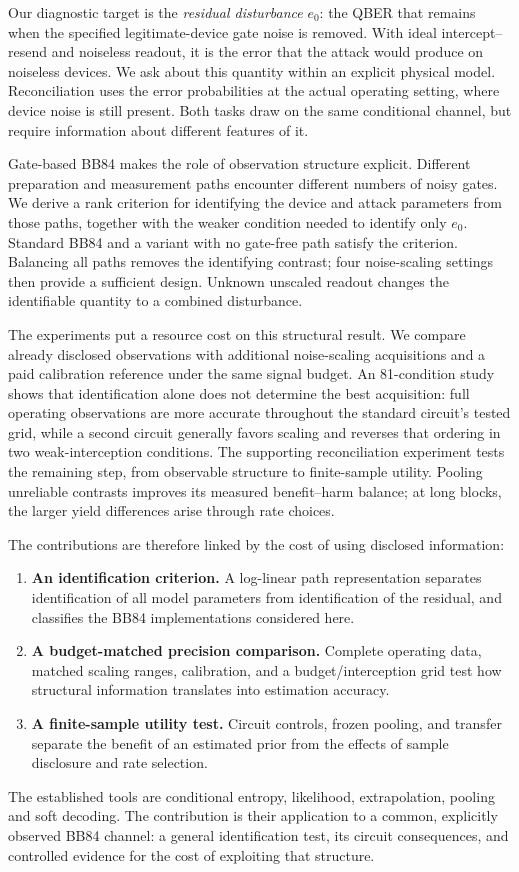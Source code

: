 \documentclass[manuscript,screen,review,anonymous]{acmart}
\begin{document}
Our diagnostic target is the \emph{residual disturbance} $e_0$: the QBER that
remains when the specified legitimate-device gate noise is removed. With ideal
intercept--resend and noiseless readout, it is the error that the attack would
produce on noiseless devices. We ask about this quantity within an explicit
physical model. Reconciliation uses the error probabilities at the actual
operating setting, where device noise is still present. Both tasks draw on the
same conditional channel, but require information about different features of it.

Gate-based BB84 makes the role of observation structure explicit. Different
preparation and measurement paths encounter different numbers of noisy gates.
We derive a rank criterion for identifying the device and attack parameters
from those paths, together with the weaker condition needed to identify only
$e_0$. Standard BB84 and a variant with no gate-free path satisfy the criterion.
Balancing all paths removes the identifying contrast; four noise-scaling settings
then provide a sufficient design. Unknown unscaled readout changes the
identifiable quantity to a combined disturbance.

The experiments put a resource cost on this structural result. We compare
already disclosed observations with additional noise-scaling acquisitions and
a paid calibration reference under the same signal budget. An 81-condition
study shows that identification alone does not determine the best acquisition:
full operating observations are more accurate throughout the standard circuit's
tested grid, while a second circuit generally favors scaling and reverses that
ordering in two weak-interception conditions. The supporting reconciliation
experiment tests the remaining step, from observable structure to finite-sample
utility. Pooling unreliable contrasts improves its measured benefit--harm
balance; at long blocks, the larger yield differences arise through rate choices.

The contributions are therefore linked by the cost of using disclosed information:
\begin{enumerate}
\item \textbf{An identification criterion.} A log-linear path representation
separates identification of all model parameters from identification of the
residual, and classifies the BB84 implementations considered here.
\item \textbf{A budget-matched precision comparison.} Complete operating data,
matched scaling ranges, calibration, and a budget/interception grid test how
structural information translates into estimation accuracy.
\item \textbf{A finite-sample utility test.} Circuit controls, frozen pooling,
and transfer separate the benefit of an estimated prior from the effects of
sample disclosure and rate selection.
\end{enumerate}
The established tools are conditional entropy, likelihood, extrapolation,
pooling and soft decoding. The contribution is their application to a common,
explicitly observed BB84 channel: a general identification test, its circuit
consequences, and controlled evidence for the cost of exploiting that structure.
\end{document}

